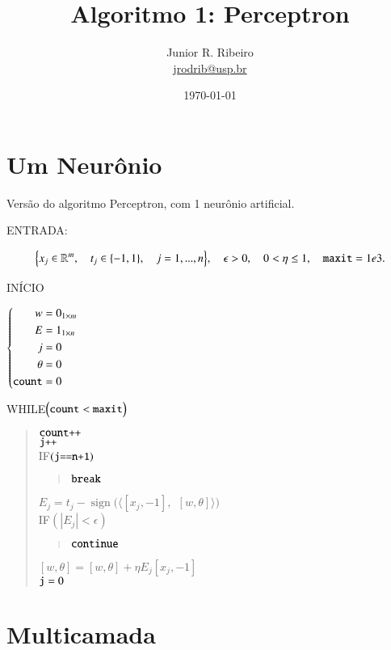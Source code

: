 \documentclass[12pt,a4paper]{article}
\title{Algoritmo 1: Perceptron}
\author{Junior R. Ribeiro \\ \url{jrodrib@usp.br}}
\date{\today}
\DeclareMathOperator{\sign}{sign}
\newcommand{\txt}[1]{\mbox{\texttt{#1}}}
\begin{document}
\maketitle

\section{Um Neurônio}
Versão do algoritmo Perceptron, com 1 neurônio artificial.

ENTRADA: 

\[
\Big\{x_j\in\mathbb{R}^m,\quad t_j\in\{-1,1\},\quad j=1,...,n\Big\}, \quad \epsilon>0, \quad 0<\eta\le 1, \quad \txt{maxit}=1e3.
\]

INÍCIO

$\left\{
\begin{aligned}
w&=0_{1\times m}
\\
E &= 1_{1\times n}
\\
j&=0
\\
\theta &= 0
\\
\txt{count}&=0
\end{aligned}
\right.
$

WHILE$\Big( \txt{count}<\txt{maxit}\Big)$\\[-24pt]
\begin{quote}
$\txt{count++}$\\
$\txt{j++}$\\
IF$(\txt{j==n+1})$\\[-22pt]
\begin{quote}
$\txt{break}$
\end{quote}
$E_j = t_j-\sign\Big(\big\langle[x_j,-1],\ \ [w,\theta]\big\rangle\Big)$\\
IF$(|E_j|<\epsilon)$\\[-24pt]
\begin{quote}
$\txt{continue}$
\end{quote}
$[w,\theta]=[w,\theta]+\eta E_j[x_j,-1]$\\
$\txt{j}=0$


\end{quote}





\section{Multicamada}
\end{document}
